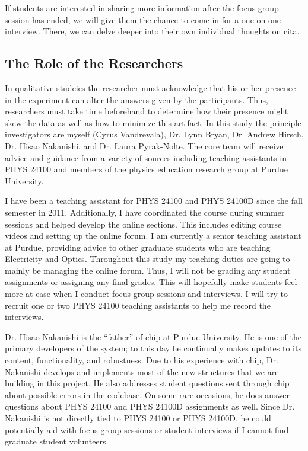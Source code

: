 If students are interested in sharing more information after the focus group session has ended, we will give them the chance to come in for a one-on-one interview. There, we can delve deeper into their own individual thoughts on \gls{cita}.

\subsection{The Role of the Researchers}

In qualitative studeies the researcher must acknowledge that his or her presence in the experiment can alter the answers given by the participants. Thus, researchers must take time beforehand to determine how their presence might skew the data as well as how to minimize this artifact\cite{denzin2012}. In this study the principle investigators are myself (Cyrus Vandrevala), Dr. Lynn Bryan, Dr. Andrew Hirsch, Dr. Hisao Nakanishi, and Dr. Laura Pyrak-Nolte. The core team will receive advice and guidance from a variety of sources including teaching assistants in PHYS 24100 and members of the physics education research group at Purdue University.

I have been a teaching assistant for PHYS 24100 and PHYS 24100D since the fall semester in 2011. Additionally, I have coordinated the course during summer sessions and helped develop the online sections. This includes editing course videos and setting up the online forum\cite{piazza}. I am currently a senior teaching assistant at Purdue, providing advice to other graduate students who are teaching Electricity and Optics. Throughout this study my teaching duties are going to mainly be managing the online forum. Thus, I will not be grading any student assignments or assigning any final grades. This will hopefully make students feel more at ease when I conduct focus group sessions and interviews. I will try to recruit one or two PHYS 24100 teaching assistants to help me record the interviews.

Dr. Hisao Nakanishi is the ``father'' of \gls{chip} at Purdue University. He is one of the primary developers of the system; to this day he continually makes updates to its content, functionality, and robustness. Due to his experience with \gls{chip}, Dr. Nakanishi develops and implements most of the new structures that we are building in this project. He also addresses student questions sent through \gls{chip} about possible errors in the codebase. On some rare occasions, he does answer questions about PHYS 24100 and PHYS 24100D assignments as well. Since Dr. Nakanishi is not directly tied to PHYS 24100 or PHYS 24100D, he could potentially aid with focus group sessions or student interviews if I cannot find graduate student volunteers.

